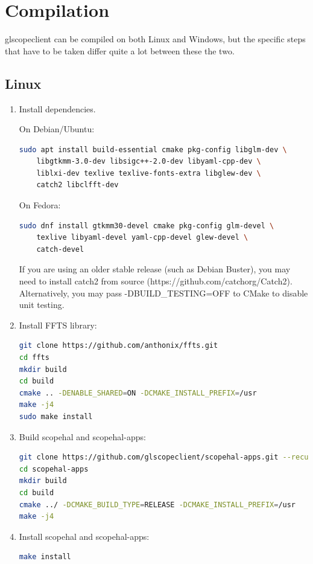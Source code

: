 \section{Compilation}

glscopeclient can be compiled on both Linux and Windows, but the specific steps that have to be taken differ quite a
lot between these the two.

\subsection{Linux}
\begin{enumerate}

\item Install dependencies.

On Debian/Ubuntu:

\begin{lstlisting}[language=sh, numbers=none]
sudo apt install build-essential cmake pkg-config libglm-dev \
	libgtkmm-3.0-dev libsigc++-2.0-dev libyaml-cpp-dev \
	liblxi-dev texlive texlive-fonts-extra libglew-dev \
	catch2 libclfft-dev
\end{lstlisting}

On Fedora:

\begin{lstlisting}[language=sh, numbers=none]
sudo dnf install gtkmm30-devel cmake pkg-config glm-devel \
	texlive libyaml-devel yaml-cpp-devel glew-devel \
	catch-devel
\end{lstlisting}

If you are using an older stable release (such as Debian Buster), you may need to install catch2 from source
(https://github.com/catchorg/Catch2). Alternatively, you may pass -DBUILD\_TESTING=OFF to CMake to disable unit testing.

\item Install FFTS library:

\begin{lstlisting}[language=sh, numbers=none]
git clone https://github.com/anthonix/ffts.git
cd ffts
mkdir build
cd build
cmake .. -DENABLE_SHARED=ON -DCMAKE_INSTALL_PREFIX=/usr
make -j4
sudo make install
\end{lstlisting}

\item Build scopehal and scopehal-apps:

\begin{lstlisting}[language=sh, numbers=none]
git clone https://github.com/glscopeclient/scopehal-apps.git --recurse-submodules
cd scopehal-apps
mkdir build
cd build
cmake ../ -DCMAKE_BUILD_TYPE=RELEASE -DCMAKE_INSTALL_PREFIX=/usr
make -j4
\end{lstlisting}

\item Install scopehal and scopehal-apps:

\begin{lstlisting}[language=sh, numbers=none]
make install
\end{lstlisting}

\end{enumerate}

